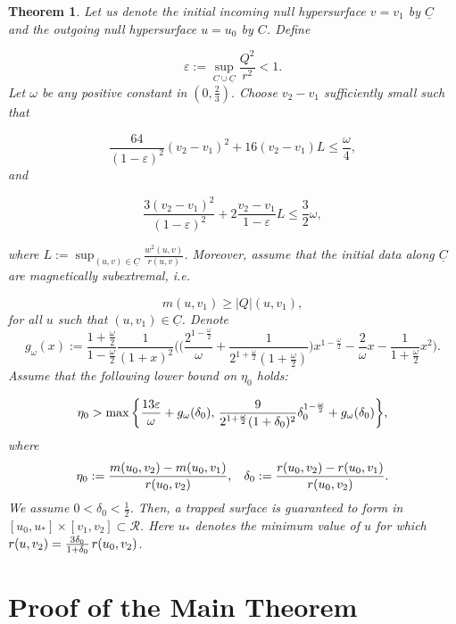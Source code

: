 \documentclass{article}[11pt]
\newcommand{\hsp}{\hspace{.5mm}}
\newcommand{\Cbar}{\underline{C}}
\newcommand{\be}{\begin{equation}}
\newcommand{\ee}{\end{equation}}
\newtheorem{theorem}{Theorem}[section]
\numberwithin{equation}{section}
\begin{document}
\begin{theorem} \label{maintechnical}
Let us denote the initial incoming null hypersurface $v=v_1$ by $\Cbar$ and the outgoing null hypersurface $u=u_0$ by $C$.  Define 

\[  \varepsilon:= \sup_{C\cup \Cbar}\frac{Q^2}{r^2} <1.  \] Let $\omega$ be any positive constant in $(0,\frac{2}{3}).$ Choose $v_2-v_1$ sufficiently small such that 

\be \label{firstone}  \frac{64}{(1-\varepsilon)^2}(v_2-v_1)^2 +16(v_2-v_1)L \leq \frac{\omega}{4},  \ee 
and

\be \frac{3 (v_2-v_1)^2}{(1-\varepsilon)^2}+ 2\frac{v_2-v_1}{1-\varepsilon}L\leq \frac{3}{2}\omega, \label{second} \ee

\noindent where $L:= \sup_{(u,v) \in \Cbar} \frac{w^2(u,v)}{r(u,v)}$. Moreover, assume that the initial data along $\Cbar$ are \textit{magnetically subextremal}, i.e. 

\be \label{nonmag} m(u,v_1) \geq \lvert Q \rvert(u,v_1),    \ee for all $u$ such that $(u,v_1)\in \Cbar$. Denote \[ g_{\omega}(x) := \frac{1+\frac{\omega}{2}}{1-\frac{\omega}{2}} \frac{1}{(1+x)^2}\bigg( \big(\frac{2^{1-\frac{\omega}{2}}}{\omega}+\frac{1}{2^{1+\frac{\omega}{2}}(1+\frac{\omega}{2})}\big) x^{1-\frac{\omega}{2}}-\frac{2}{\omega}x - \frac{1}{1+\frac{\omega}{2}}x^2  \bigg).  \]Assume that the following lower bound on $\eta_0$ holds:

\be \eta_0 > \max \bigg\{ \frac{13\varepsilon}{\omega}+g_{\omega}(\delta_0), \hsp \frac{9}{2^{1+\frac{\omega}{2}}(1+\delta_0)^2}\delta_0^{1-\frac{\omega}{2}}+g_{\omega}(\delta_0)\bigg\},\ee where \[ \eta_0 := \frac{m(u_0,v_2)-m(u_0,v_1)}{r(u_0,v_2)}, \hspace{3mm} \delta_0 := \frac{r(u_0,v_2)-r(u_0,v_1)}{r(u_0,v_2)}.  \]We assume $0<\delta_0< \frac{1}{2}$. Then, a trapped surface is guaranteed to form in $[u_0, u_*]\times [v_1, v_2]\subset \mathcal{R}$. Here $u_*$ denotes the minimum value of $u$ for which $r(u,v_2)= \frac{3\delta_0}{1+\delta_0} \hsp r(u_0,v_2)$. 
\end{theorem}

\section{Proof of the Main Theorem}
\end{document}
